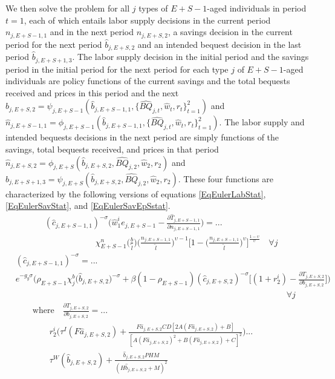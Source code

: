 \documentclass[letterpaper,12pt]{article}
\theoremstyle{definition}
\begin{document}
  We then solve the problem for all $j$ types of $E+S-1$-aged individuals in period $t=1$, each of which entails labor supply decisions in the current period $n_{j,E+S-1,1}$ and in the next period $n_{j,E+S,2}$, a savings decision in the current period for the next period $\hat{b}_{j,E+S,2}$ and an intended bequest decision in the last period $\hat{b}_{j,E+S+1,3}$. The labor supply decision in the initial period and the savings period in the initial period for the next period for each type $j$ of $E+S-1$-aged individuals are policy functions of the current savings and the total bequests received and prices in this period and the next $\hat{b}_{j,E+S,2} = \psi_{j,E+S-1}(\hat{b}_{j,E+S-1,1},\{\hat{BQ}_{j,t},\hat{w}_t,r_t\}_{t=1}^2)$ and $\hat{n}_{j,E+S-1,1} = \phi_{j,E+S-1}(\hat{b}_{j,E+S-1,1},\{\hat{BQ}_{j,t},\hat{w}_t,r_t\}_{t=1}^2)$. The labor supply and intended bequests decisions in the next period are simply functions of the savings, total bequests received, and prices in that period $\hat{n}_{j,E+S,2} = \phi_{j,E+S}(\hat{b}_{j,E+S,2},\hat{BQ}_{j,2},\hat{w}_2,r_2)$ and $\hat{b}_{j,E+S+1,3} = \psi_{j,E+S}(\hat{b}_{j,E+S,2},\hat{BQ}_{j,2},\hat{w}_2,r_2)$. These four functions are characterized by the following versions of equations \eqref{EqEulerLabStat}, \eqref{EqEulerSavStat}, and \eqref{EqEulerSavEpSstat}.
  \begin{equation}\label{EqEulerSm1labt1}
    \begin{split}
      &(\hat{c}_{j,E+S-1,1})^{-\sigma}\Biggl(\hat{w}_1^i e_{j,E+S-1} - \frac{\partial\hat{T}_{j,E+S-1,1}}{\partial n_{j,E+S-1,1}}\Biggr) = ... \\
      &\qquad\qquad\qquad \chi^n_{E+S-1}\biggl(\frac{b}{\tilde{l}}\biggr)\biggl(\frac{n_{j,E+S-1,1}}{\tilde{l}}\biggr)^{\upsilon-1}\Biggl[1 - \biggl(\frac{n_{j,E+S-1,1}}{\tilde{l}}\biggr)^\upsilon\Biggr]^{\frac{1-\upsilon}{\upsilon}} \quad\forall j
    \end{split}
  \end{equation}
  \begin{equation}\label{EqEulerSm1savt1}
    \begin{split}
      &(\hat{c}_{j,E+S-1,1})^{-\sigma} = ... \\
      &e^{-g_y\sigma}\Biggl(\rho_{E+S-1}\chi^b_j \bigl(\hat{b}_{j,E+S,2}\bigr)^{-\sigma} + \beta(1-\rho_{E+S-1})(\hat{c}_{j,E+S,2})^{-\sigma}\Biggl[(1 + r_2^i) - \frac{\partial T_{j,E+S,2}}{\partial b_{j,E+S,2}}\Biggr]\Biggr) \\
      &\qquad\qquad\qquad\qquad\qquad\qquad\qquad\qquad\qquad\qquad\qquad\qquad\qquad\qquad\qquad\qquad\forall j \\
      &\qquad\text{where}\quad \frac{\partial T_{j,E+S,2}}{\partial b_{j,E+S,2}} = ...\\
      &\qquad\qquad r_2^i\Biggl(\tau^I(F\hat{a}_{j,E+S,2}) + \frac{F\hat{a}_{j,E+S,2}CD\left[2A(F\hat{a}_{j,E+S,2}) + B\right]}{\left[A(F\hat{a}_{j,E+S,2})^2 + B(F\hat{a}_{j,E+S,2}) + C\right]^2}\Biggr) ... \\
      &\qquad\qquad \tau^W(\hat{b}_{j,E+S,2}) + \frac{\hat{b}_{j,E+S,2}PHM}{\left(H\hat{b}_{j,E+S,2} + M\right)^2}
    \end{split}
  \end{equation}
\end{document}

